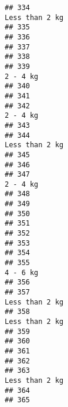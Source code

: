 \documentclass[
]{article}
\begin{document}
\begin{verbatim}
## 334                                                              Less than 2 kg
## 335                                                                            
## 336                                                                            
## 337                                                                            
## 338                                                                            
## 339                                                                    2 - 4 kg
## 340                                                                            
## 341                                                                            
## 342                                                                    2 - 4 kg
## 343                                                                            
## 344                                                              Less than 2 kg
## 345                                                                            
## 346                                                                            
## 347                                                                    2 - 4 kg
## 348                                                                            
## 349                                                                            
## 350                                                                            
## 351                                                                            
## 352                                                                            
## 353                                                                            
## 354                                                                            
## 355                                                                    4 - 6 kg
## 356                                                                            
## 357                                                              Less than 2 kg
## 358                                                              Less than 2 kg
## 359                                                                            
## 360                                                                            
## 361                                                                            
## 362                                                                            
## 363                                                              Less than 2 kg
## 364                                                                            
## 365                                                                            

\end{verbatim}
\end{document}
